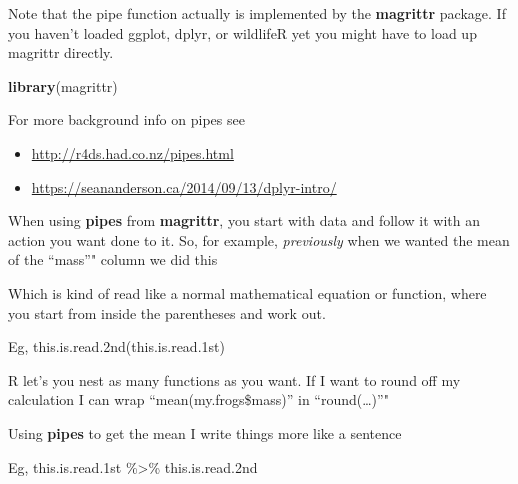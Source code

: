 \documentclass[]{book}
\newenvironment{Shaded}{\begin{snugshade}}{\end{snugshade}}
\newcommand{\KeywordTok}[1]{\textcolor[rgb]{0.13,0.29,0.53}{\textbf{#1}}}
\newcommand{\CommentTok}[1]{\textcolor[rgb]{0.56,0.35,0.01}{\textit{#1}}}
\newcommand{\OperatorTok}[1]{\textcolor[rgb]{0.81,0.36,0.00}{\textbf{#1}}}
\newcommand{\NormalTok}[1]{#1}
\providecommand{\tightlist}{%
  \setlength{\itemsep}{0pt}\setlength{\parskip}{0pt}}
\theoremstyle{definition}
\theoremstyle{definition}
\theoremstyle{definition}
\theoremstyle{remark}
\begin{document}
Note that the pipe function actually is implemented by the
\textbf{magrittr} package. If you haven't loaded ggplot, dplyr, or
wildlifeR yet you might have to load up magrittr directly.

\begin{Shaded}
\begin{Highlighting}[]
\KeywordTok{library}\NormalTok{(magrittr) }
\end{Highlighting}
\end{Shaded}

For more background info on pipes see

\begin{itemize}
\tightlist
\item
  \url{http://r4ds.had.co.nz/pipes.html}
\item
  \url{https://seananderson.ca/2014/09/13/dplyr-intro/}
\end{itemize}

When using \textbf{pipes} from \textbf{magrittr}, you start with data
and follow it with an action you want done to it. So, for example,
\emph{previously} when we wanted the mean of the ``mass''" column we did
this

\begin{Shaded}
\end{Shaded}

Which is kind of read like a normal mathematical equation or function,
where you start from inside the parentheses and work out.

Eg, this.is.read.2nd(this.is.read.1st)

R let's you nest as many functions as you want. If I want to round off
my calculation I can wrap ``mean(my.frogs\$mass)'' in
``round(\ldots{})''"

\begin{Shaded}
\end{Shaded}

Using \textbf{pipes} to get the mean I write things more like a sentence

Eg, this.is.read.1st \%\textgreater{}\% this.is.read.2nd
\end{document}
